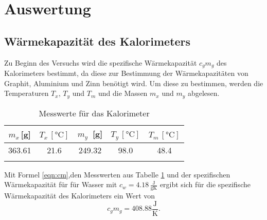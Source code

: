 
\section{Auswertung}
\subsection{Wärmekapazität des Kalorimeters}
Zu Beginn des Versuchs wird die spezifische Wärmekapazität $c_gm_g$ des Kalorimeters bestimmt,
da diese zur Bestimmung der Wärmekapazitäten von Graphit, Aluminium und Zinn benötigt wird.
Um diese zu bestimmen, werden die Temperaturen $T_x$, $T_y$ und $T_m$ und die Massen $m_x$ und $m_y$ abgelesen.
\newline
\begin{table}
  \centering
  \caption{Messwerte für das Kalorimeter}
  \begin{tabular}{c c c c c}
    \toprule
    $m_x$\,[g] & $T_x$\,$[\si{\degreeCelsius}]$& $m_y\,$ [g] & $T_y$\,$[\si{\degreeCelsius}]$ & $T_m$\,$[\si{\degreeCelsius}]$\\
    \midrule
    363.61 & 21.6 & 249.32 & 98.0 & 48.4\\
    \bottomrule
    \label{fig:kalorimeter}
  \end{tabular}
\end{table}
\newline
Mit Formel \ref{eqn:cm},den Messwerten aus Tabelle \ref{fig:kalorimeter} und der spezifischen Wärmekapazität für
für Wasser mit $c_w= 4.18\,\frac{\text{J}}{\text{gK}}$ ergibt
sich für die spezifische Wärmekapazität des Kalorimeters ein Wert von
\begin{equation*}
  c_gm_g = 408.88 \frac{\text{J}}{\text{K}}.
\end{equation*}
